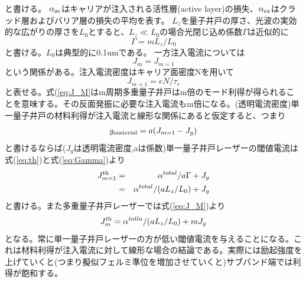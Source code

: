 と書ける。
$\alpha_{\rm{ac}}$はキャリアが注入される活性層(active layer)の損失、$\alpha_{\rm{ex}}$はクラッド層およびバリア層の損失の平均を表す。
$L_{z}$を量子井戸の厚さ、光波の実効的な広がりの厚さを$L_{0}$とすると、$L_{z}\ll L_{0}$の場合光閉じ込め係数$\Gamma$は近似的に
\begin{equation}
\Gamma = mL_{z}/L_{0}
\label{eq:Gamma}
\end{equation}
と書ける。$L_{0}$は典型的に0.1umである。
一方注入電流については
\begin{equation}
J_{m}=J_{m=1}
\label{eq:J_M}
\end{equation}
という関係がある。注入電流密度はキャリア面密度Nを用いて
\begin{equation}
J_{m=1}=eN/\tau_{r}
\end{equation}
と表せる。式(\ref{eq:J_M}はm周期多重量子井戸はm倍のモード利得が得られることを意味する。その反面発振に必要な注入電流もm倍になる。(透明電流密度)単一量子井戸の材料利得が注入電流と線形な関係にあると仮定すると、つまり
\begin{eqnarray}
g_{\rm{material}}=a(J_{m=1}-J_{g})
\end{eqnarray}
と書けるならば($J_{g}$は透明電流密度,aは係数)単一量子井戸レーザーの閾値電流は式(\ref{eq:th})と式(\ref{eq:Gamma})より
\begin{eqnarray}
J^{\rm{th}}_{m=1}&=&\alpha^{total}/ a\Gamma + J_{g}\nonumber\\
&=&\alpha^{total}/(aL_{z}/L_{0})+J_{g} 
\end{eqnarray}
と書ける。また多重量子井戸レーザーでは式(\ref{eq:J_M})より
\begin{equation}
J_{m}^{t\rm{h}}=\alpha^{totla}/(aL_{z}/L_{0}) + mJ_{g}
\label{eq:Mj0}
\end{equation}
となる。常に単一量子井戸レーザーの方が低い閾値電流を与えることになる。これは材料利得が注入電流に対して線形な場合の結論である。実際には励起強度を上げていくと(つまり擬似フェルミ準位を増加させていくと)サブバンド端では利得が飽和する。


